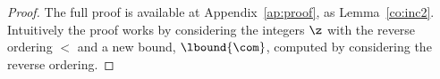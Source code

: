 \begin{proof}
  The full proof is available at Appendix~\ref{ap:proof}, as
  Lemma~\ref{co:inc2}. Intuitively the proof works by considering the
  integers \(\z\) with the reverse ordering \(<\) and a new bound,
  \(\lbound{\com}\), computed by considering the reverse ordering.
\end{proof}

